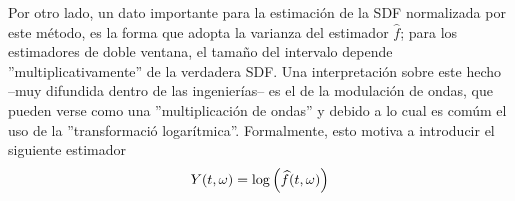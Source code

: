 %
%
%



%

Por otro lado,
un dato importante para la estimaci\'on de la SDF normalizada por este m\'etodo,
es la forma 
que adopta la varianza del
estimador $\widehat{f}$; para los estimadores de doble ventana, 
el tama\~no del intervalo
depende ''multiplicativamente'' de la verdadera SDF.
Una interpretaci\'on sobre este hecho --muy difundida dentro de las ingenier\'ias-- es el de la 
modulaci\'on de ondas, que pueden verse como una ''multiplicaci\'on de ondas'' y debido a lo cual
es com\'um el uso de la ''transformaci\'o logar\'itmica''.
Formalmente, esto motiva a introducir el siguiente estimador
\begin{equation*}
Y(t,\omega) = \log{\left( \widehat{ f }(t,\omega)\right)}
\end{equation*}

